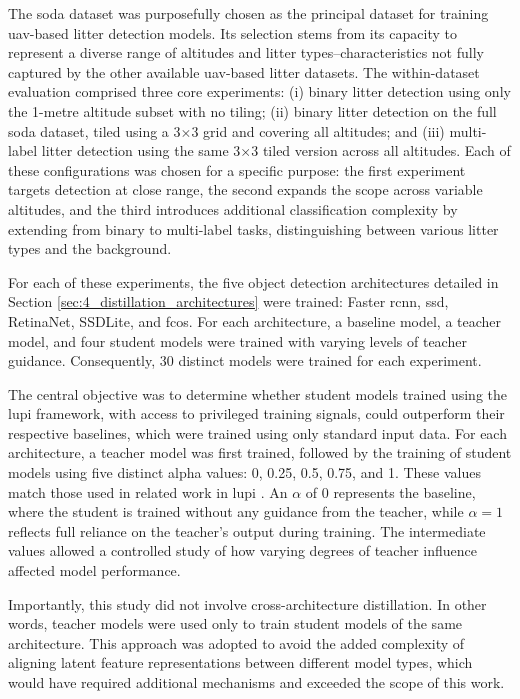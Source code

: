 The \gls{soda} dataset was purposefully chosen as the principal dataset for training \gls{uav}-based litter detection models. Its selection stems from its capacity to represent a diverse range of altitudes and litter types--characteristics not fully captured by the other available \gls{uav}-based litter datasets. The within-dataset evaluation comprised three core experiments: (i) binary litter detection using only the 1-metre altitude subset with no tiling; (ii) binary litter detection on the full \gls{soda} dataset, tiled using a 3$\times$3 grid and covering all altitudes; and (iii) multi-label litter detection using the same 3$\times$3 tiled version across all altitudes. Each of these configurations was chosen for a specific purpose: the first experiment targets detection at close range, the second expands the scope across variable altitudes, and the third introduces additional classification complexity by extending from binary to multi-label tasks, distinguishing between various litter types and the background.

For each of these experiments, the five object detection architectures detailed in Section \ref{sec:4_distillation_architectures} were trained: Faster \gls{rcnn}, \gls{ssd}, RetinaNet, SSDLite, and \gls{fcos}. For each architecture, a baseline model, a teacher model, and four student models were trained with varying levels of teacher guidance. Consequently, 30 distinct models were trained for each experiment.

The central objective was to determine whether student models trained using the \gls{lupi} framework, with access to privileged training signals, could outperform their respective baselines, which were trained using only standard input data. For each architecture, a teacher model was first trained, followed by the training of student models using five distinct \gls{alpha} values: 0, 0.25, 0.5, 0.75, and 1. These values match those used in related work in \gls{lupi} \cite{lab2wild}. An $\alpha$ of 0 represents the baseline, where the student is trained without any guidance from the teacher, while $\alpha = 1$ reflects full reliance on the teacher’s output during training. The intermediate values allowed a controlled study of how varying degrees of teacher influence affected model performance.


Importantly, this study did not involve cross-architecture distillation. In other words, teacher models were used only to train student models of the same architecture. This approach was adopted to avoid the added complexity of aligning latent feature representations between different model types, which would have required additional mechanisms and exceeded the scope of this work.

